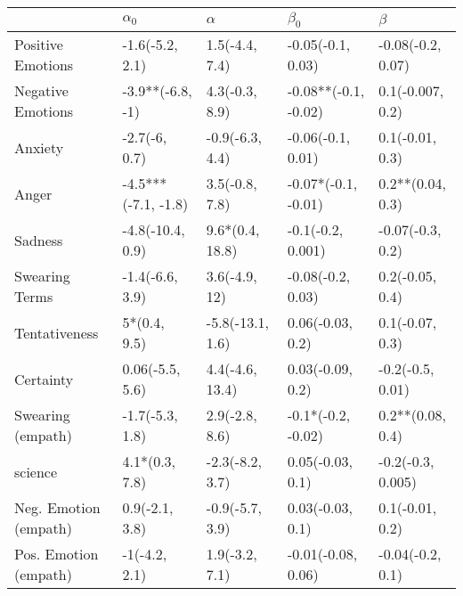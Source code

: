 \begin{tabular}{lllll}
\toprule
{} &           $\alpha_0$ &          $\alpha$ &             $\beta_0$ &            $\beta$ \\
\midrule
Positive Emotions     &      -1.6(-5.2, 2.1) &    1.5(-4.4, 7.4) &     -0.05(-0.1, 0.03) &  -0.08(-0.2, 0.07) \\
Negative Emotions     &     -3.9**(-6.8, -1) &    4.3(-0.3, 8.9) &  -0.08**(-0.1, -0.02) &   0.1(-0.007, 0.2) \\
Anxiety               &        -2.7(-6, 0.7) &   -0.9(-6.3, 4.4) &     -0.06(-0.1, 0.01) &    0.1(-0.01, 0.3) \\
Anger                 &  -4.5***(-7.1, -1.8) &    3.5(-0.8, 7.8) &   -0.07*(-0.1, -0.01) &   0.2**(0.04, 0.3) \\
Sadness               &     -4.8(-10.4, 0.9) &   9.6*(0.4, 18.8) &     -0.1(-0.2, 0.001) &   -0.07(-0.3, 0.2) \\
Swearing Terms        &      -1.4(-6.6, 3.9) &     3.6(-4.9, 12) &     -0.08(-0.2, 0.03) &    0.2(-0.05, 0.4) \\
Tentativeness         &         5*(0.4, 9.5) &  -5.8(-13.1, 1.6) &      0.06(-0.03, 0.2) &    0.1(-0.07, 0.3) \\
Certainty             &      0.06(-5.5, 5.6) &   4.4(-4.6, 13.4) &      0.03(-0.09, 0.2) &   -0.2(-0.5, 0.01) \\
Swearing (empath)     &      -1.7(-5.3, 1.8) &    2.9(-2.8, 8.6) &    -0.1*(-0.2, -0.02) &   0.2**(0.08, 0.4) \\
science               &       4.1*(0.3, 7.8) &   -2.3(-8.2, 3.7) &      0.05(-0.03, 0.1) &  -0.2(-0.3, 0.005) \\
Neg. Emotion (empath) &       0.9(-2.1, 3.8) &   -0.9(-5.7, 3.9) &      0.03(-0.03, 0.1) &    0.1(-0.01, 0.2) \\
Pos. Emotion (empath) &        -1(-4.2, 2.1) &    1.9(-3.2, 7.1) &    -0.01(-0.08, 0.06) &   -0.04(-0.2, 0.1) \\
\bottomrule
\end{tabular}
